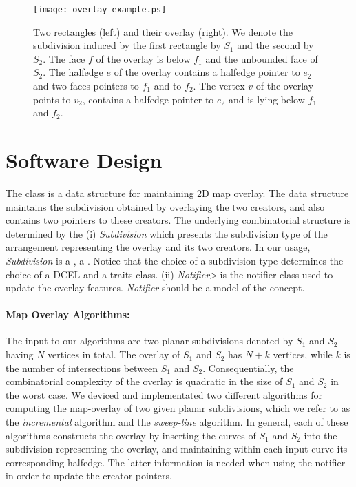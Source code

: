 \begin{figure}[h]
\begin{ccTexOnly}
    \centerline{
      \texttt{[image: overlay\_example.ps]}
    }
\end{ccTexOnly}
\caption{Two rectangles (left) and their overlay (right). We denote the subdivision 
induced by the first rectangle by $S_1$ and the second by $S_2$. 
The face $f$ of the overlay is below $f_1$ and the unbounded face of $S_2$. 
The halfedge $e$ of the overlay contains a halfedge pointer to $e_2$ and two faces pointers 
to $f_1$ and to $f_2$. The vertex $v$ of the overlay points to $v_2$, contains a halfedge 
pointer to $e_2$ and is lying below $f_1$ and $f_2$.
\label{OVL_sec:overlay_example}}
\end{figure}

\section{Software Design}
The  class 
is a data structure for maintaining 2D map overlay.
The data structure maintains the subdivision obtained by overlaying 
the two creators,
and also contains two pointers to these creators. 
The underlying combinatorial structure is determined by the
(i) {\it Subdivision} which presents the subdivision type of the arrangement 
representing the overlay and its two creators. 
In our usage, {\it Subdivision} is a , 
a .
Notice that the choice of a subdivision type determines the choice 
of a DCEL and a traits class.
(ii) {\it Notifier>} is the notifier class used to update the overlay features. 
{\it Notifier} should be a model of the 
 concept.

\paragraph{Map Overlay Algorithms:}
The input to our algorithms are two planar subdivisions denoted by $S_1$ and $S_2$ having 
$N$ vertices in total. The overlay of $S_1$ and $S_2$ has $N+k$ vertices, 
while $k$ is the number of intersections between 
$S_1$ and $S_2$. 
Consequentially, the combinatorial complexity of the overlay is quadratic 
in the size of $S_1$ and $S_2$ in the worst case.
We deviced and implementated two different algorithms for computing the map-overlay 
of two given planar subdivisions, 
which we refer to as the {\it incremental} algorithm and the {\it sweep-line} algorithm. 
In general, each of these algorithms constructs the overlay by inserting 
the curves of $S_1$ and $S_2$ into the subdivision representing the overlay,
and maintaining within each input curve its corresponding halfedge. 
The latter information is needed when using the notifier in order to
update the creator pointers. 

